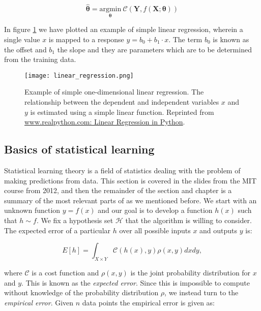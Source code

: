 \begin{equation}
\hat{\bm{\theta}} = \underset{\bm{\theta}}
{\text{argmin}} \ \mathcal{C}(\bm{Y}, f(\bm{X} ; \bm{\theta}))
\end{equation}

In figure \ref{fig:linear-regression} we have plotted an example
of simple linear regression, wherein a single value $x$ is mapped
to a response $y = b_0 + b_1 \cdot x$. The term $b_0$ is known
as the offset and $b_1$ the slope and they are parameters which
are to be determined from the training data.

\begin{figure}[H]
    \centering
    \texttt{[image: linear\_regression.png]}
    \caption{Example of simple one-dimensional linear regression.
        The relationship between the dependent and independent
        variables $x$ and $y$ is estimated using a simple linear function.
        Reprinted from \href{https://realpython.com/linear-regression-in-python/}
        {www.realpython.com: Linear Regression in Python}.}
    \label{fig:linear-regression}
\end{figure}

\subsection{Basics of statistical learning}
Statistical learning theory is a field of statistics dealing with the problem
of making predictions from data. This section is covered in the slides
from the MIT course \parencite[9.2520: Statistical Learning Theory and
    applications]{mitslides} from 2012, and then the remainder of the section
and chapter is a summary of the most relevant parts of \parencite[Mehta et al.]{
    mehta2019high} as we mentioned before.
We start with an unknown function
$y = f(x)$ and our goal is to develop a function $h(x)$
such that $h \sim f$. We fix a hypothesis set $\mathcal{H}$ that the
algorithm is willing to consider. The expected error of a particular $h$
over all possible inputs $x$ and outputs $y$ is:

\begin{equation}
 E[h] = \int_{X \times Y} \mathcal{C}(h(x), y) \rho(x,y) dx dy ,
\end{equation}

where $\mathcal{C}$ is a cost function and $\rho(x,y)$ is the joint probability
distribution for $x$ and $y$. This is known as the \textit{expected error}.
Since this is impossible to compute without knowledge of the probability distribution
$\rho$, we instead turn to the \textit{empirical error}. Given $n$ data points
the empirical error is given as:

